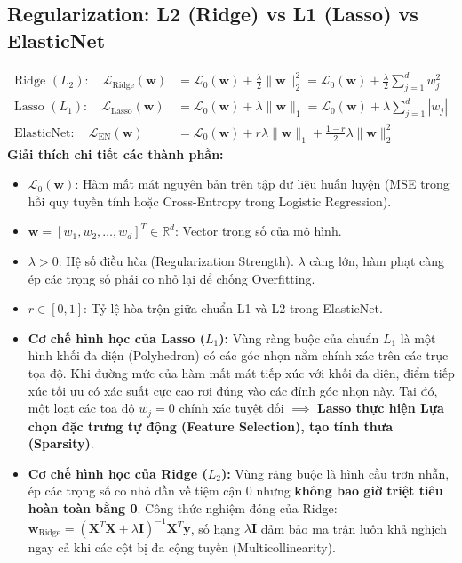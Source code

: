 \documentclass[10pt,a4paper]{article}
\begin{document}
\subsection{Regularization: L2 (Ridge) vs L1 (Lasso) vs ElasticNet}
\begin{align}
    \text{Ridge } (L_2): \quad \mathcal{L}_{\text{Ridge}}(\mathbf{w}) &= \mathcal{L}_0(\mathbf{w}) + \frac{\lambda}{2} \|\mathbf{w}\|_2^2 = \mathcal{L}_0(\mathbf{w}) + \frac{\lambda}{2} \sum_{j=1}^d w_j^2 \\
    \text{Lasso } (L_1): \quad \mathcal{L}_{\text{Lasso}}(\mathbf{w}) &= \mathcal{L}_0(\mathbf{w}) + \lambda \|\mathbf{w}\|_1 = \mathcal{L}_0(\mathbf{w}) + \lambda \sum_{j=1}^d |w_j| \\
    \text{ElasticNet}: \quad \mathcal{L}_{\text{EN}}(\mathbf{w}) &= \mathcal{L}_0(\mathbf{w}) + r \lambda \|\mathbf{w}\|_1 + \frac{1-r}{2} \lambda \|\mathbf{w}\|_2^2
\end{align}
\textbf{Giải thích chi tiết các thành phần:}
\begin{itemize}[leftmargin=*]
    \item $\mathcal{L}_0(\mathbf{w})$: Hàm mất mát nguyên bản trên tập dữ liệu huấn luyện (MSE trong hồi quy tuyến tính hoặc Cross-Entropy trong Logistic Regression).
    \item $\mathbf{w} = [w_1, w_2, \dots, w_d]^T \in \mathbb{R}^d$: Vector trọng số của mô hình.
    \item $\lambda > 0$: Hệ số điều hòa (Regularization Strength). $\lambda$ càng lớn, hàm phạt càng ép các trọng số phải co nhỏ lại để chống Overfitting.
    \item $r \in [0, 1]$: Tỷ lệ hòa trộn giữa chuẩn L1 và L2 trong ElasticNet.
    \item \textbf{Cơ chế hình học của Lasso ($L_1$):} Vùng ràng buộc của chuẩn $L_1$ là một hình khối đa diện (Polyhedron) có các góc nhọn nằm chính xác trên các trục tọa độ. Khi đường mức của hàm mất mát tiếp xúc với khối đa diện, điểm tiếp xúc tối ưu có xác suất cực cao rơi đúng vào các đỉnh góc nhọn này. Tại đó, một loạt các tọa độ $w_j = 0$ chính xác tuyệt đối $\implies$ \textbf{Lasso thực hiện Lựa chọn đặc trưng tự động (Feature Selection), tạo tính thưa (Sparsity)}.
    \item \textbf{Cơ chế hình học của Ridge ($L_2$):} Vùng ràng buộc là hình cầu trơn nhẵn, ép các trọng số co nhỏ dần về tiệm cận 0 nhưng \textbf{không bao giờ triệt tiêu hoàn toàn bằng 0}. Công thức nghiệm đóng của Ridge: $\mathbf{w}_{\text{Ridge}} = (\mathbf{X}^T\mathbf{X} + \lambda \mathbf{I})^{-1} \mathbf{X}^T \mathbf{y}$, số hạng $\lambda \mathbf{I}$ đảm bảo ma trận luôn khả nghịch ngay cả khi các cột bị đa cộng tuyến (Multicollinearity).
\end{itemize}
\end{document}
